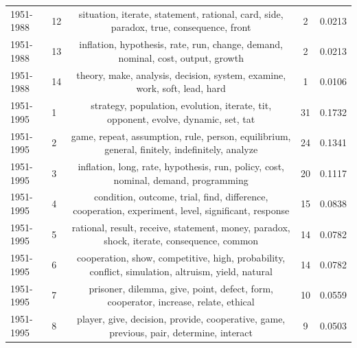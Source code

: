 \documentclass{article}
\theoremstyle{definition}
\begin{document}
\begin{table}[!hbtp]
\begin{center}
{\begin{tabular}{llccc}
             1951-1988 &              12 &                        situation, iterate, statement, rational, card, side, paradox, true, consequence, front &                2 &                  0.0213 \\
             1951-1988 &              13 &                               inflation, hypothesis, rate, run, change, demand, nominal, cost, output, growth &                2 &                  0.0213 \\
             1951-1988 &              14 &                                     theory, make, analysis, decision, system, examine, work, soft, lead, hard &                1 &                  0.0106 \\
             \midrule
             1951-1995 &               1 &                            strategy, population, evolution, iterate, tit, opponent, evolve, dynamic, set, tat &               31 &                  0.1732 \\
             1951-1995 &               2 &                 game, repeat, assumption, rule, person, equilibrium, general, finitely, indefinitely, analyze &               24 &                  0.1341 \\
             1951-1995 &               3 &                            inflation, long, rate, hypothesis, run, policy, cost, nominal, demand, programming &               20 &                  0.1117 \\
             1951-1995 &               4 &            condition, outcome, trial, find, difference, cooperation, experiment, level, significant, response &               15 &                  0.0838 \\
             1951-1995 &               5 &                     rational, result, receive, statement, money, paradox, shock, iterate, consequence, common &               14 &                  0.0782 \\
             1951-1995 &               6 &             cooperation, show, competitive, high, probability, conflict, simulation, altruism, yield, natural &               14 &                  0.0782 \\
             1951-1995 &               7 &                           prisoner, dilemma, give, point, defect, form, cooperator, increase, relate, ethical &               10 &                  0.0559 \\
             1951-1995 &               8 &                       player, give, decision, provide, cooperative, game, previous, pair, determine, interact &                9 &                  0.0503 \\

\end{tabular}}
\end{center}
\end{table}
\end{document}
